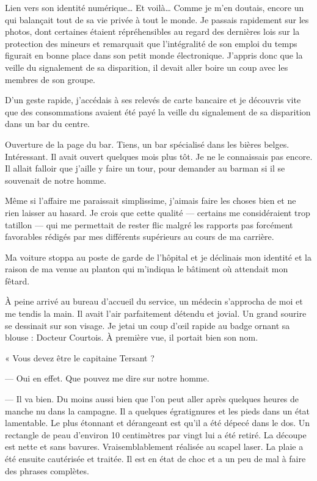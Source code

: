 Lien vers son identité numérique… Et voilà… Comme je m'en doutais, encore un qui balançait tout de sa vie privée à tout
le monde. Je passais rapidement sur les photos, dont certaines étaient répréhensibles au regard des dernières lois sur
la protection des mineurs et remarquait que l'intégralité de son emploi du temps figurait en bonne place dans son petit
monde électronique. J'appris donc que la veille du signalement de sa disparition, il devait aller boire un coup avec
les membres de son groupe.

D'un geste rapide, j'accédais à ses relevés de carte bancaire et je découvris vite que des consommations avaient été
payé la veille du signalement de sa disparition dans un bar du centre.

Ouverture de la page du bar. Tiens, un bar spécialisé dans les bières belges. Intéressant. Il avait ouvert quelques
mois plus tôt. Je ne le connaissais pas encore. Il allait falloir que j'aille y faire un tour, pour demander au barman
si il se souvenait de notre homme.

Même si l'affaire me paraissait simplissime, j'aimais faire les choses bien et ne rien laisser au hasard. Je crois que
cette qualité — certains me considéraient trop tatillon — qui me permettait de rester flic malgré les rapports pas
forcément favorables rédigés par mes différents supérieurs au cours de ma carrière.

Ma voiture stoppa au poste de garde de l'hôpital et je déclinais mon identité et la raison de ma venue au planton qui
m'indiqua le bâtiment où attendait mon fêtard.

À peine arrivé au bureau d'accueil du service, un médecin s'approcha de moi et me tendis la main.
Il avait l'air parfaitement détendu et jovial. Un grand sourire se dessinait sur son visage. Je jetai un coup d'œil
rapide au badge ornant sa blouse : Docteur Courtois. À première vue, il portait bien son nom.

« Vous devez être le capitaine Tersant ?

— Oui en effet. Que pouvez me dire sur notre homme.

— Il va bien. Du moins aussi bien que l'on peut aller après quelques heures de manche nu dans la campagne. Il a
quelques égratignures et les pieds dans un état lamentable. Le plus étonnant et dérangeant est qu'il a été dépecé 
dans le dos. Un rectangle de peau d'environ 10 centimètres par vingt lui a été retiré. La découpe est nette et sans 
bavures. Vraisemblablement réalisée au scapel laser. La plaie a été ensuite cautérisée et traitée. Il est en état de 
choc et a un peu de mal à faire des phrases complètes.

